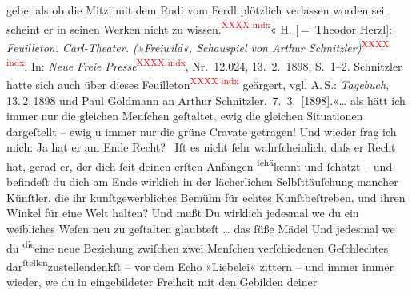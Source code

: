 \begin{ledgroupsized}[t]{13cm}
{{{                        gebe, als ob die Mitzi mit dem Rudi vom Ferdl plötzlich verlassen worden
                        sei, scheint er in seinen Werken nicht zu wissen.\textcolor{red}{\textsuperscript{XXXX indx}}« H. [ = Theodor Herzl]: \emph{Feuilleton.
                        Carl-Theater. (»Freiwild«, Schauspiel von Arthur Schnitzler)}\textcolor{red}{\textsuperscript{XXXX indx}}. In: \emph{Neue Freie Presse}\textcolor{red}{\textsuperscript{XXXX indx}}, Nr. 12.024, 13. 2. 1898, S. 1–2. Schnitzler hatte sich auch über dieses Feuilleton\textcolor{red}{\textsuperscript{XXXX indx}} geärgert, vgl. A. S.: \emph{Tagebuch}, 13. 2. 1898 und Paul Goldmann an Arthur Schnitzler, 7. 3. [1898].}}}\label{K_L02988-55h}«{\dots}
               als hätt ich immer nur die gleichen Menſchen geſtaltet\textcolor{gray}{,}{ }{\pb}ewig die gleichen Situationen dargeſtellt –
               ewig u immer nur die grüne Cravate getragen! Und wieder frag ich mich: Ja hat er am
               Ende Recht? {\dotstwo} Iſt es nicht ſehr wahrſcheinlich, daſs er
               Recht hat, gerad er, der dich ſeit deinen erſten Anfängen \substVorne{}\textsuperscript{ſchä}\substDazwischen{}ke\substHinten{}nnt und ſchätzt – und befindeſt du dich am Ende wirklich in der lächerlichen
               Selbſttäuſchung mancher {\pb}Künſtler, die ihr
               kunſtgewerbliches Bemühn für echtes Kunſtbeſtreben, und ihren Winkel für eine Welt
               halten? Und mußt Du wirklich jedesmal we{\geminationn} du ein
               weibliches Weſen neu zu geſtalten glaubteſt \label{T_L02988-4v}\label{T_L02988-4h}{ }{\dots} das ſüße Mädel {\dotstwo} Und jedesmal
                  we{\geminationn} du \substVorne{}\textsuperscript{die}\substDazwischen{}eine neue\substHinten{} Beziehung zwiſchen zwei Menſchen verſchiedenen Geſchlechtes dar\substVorne{}\textsuperscript{ſtellen}{\allowbreak}\substDazwischen{}zustellen\substHinten{}{ }{\pb}denkſt – vor dem Echo »Liebelei« zittern – und immer immer wieder, we{\geminationn} du in eingebildeter Freiheit mit den Gebilden deiner

\end{ledgroupsized}
